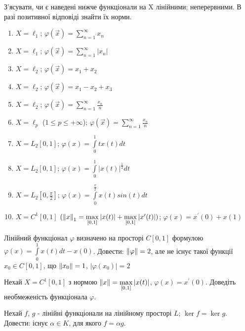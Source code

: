\begin{exercise}
    З'ясувати, чи є наведені нижче функціонали на X лінійними; 
    неперервними. В разі позитивної відповіді знайти їх норми.
    \begin{enumerate}[label=\ukr*)]
        \item $X = \ell_1$; $\varphi(\vec{x}) = \sum\limits_{n=1}^{\infty} x_n $
        \item $X = \ell_1$; $\varphi(\vec{x}) = \sum\limits_{n=1}^{\infty} |x_n| $
        \item $X = \ell_2$; $\varphi(\vec{x}) = x_1 + x_2 $
        \item $X = \ell_2$; $\varphi(\vec{x}) = x_1 - x_2 + x_3$
        \item $X = \ell_2$; $\varphi(\vec{x}) = \sum\limits_{n=1}^{\infty} \frac{x_n}{n}$
        \item $X = \ell_p$ ($1 \leq p \leq +\infty$); $\varphi(\vec{x}) = 
        \sum\limits_{n=1}^{\infty} \frac{x_n}{n}$
        \item $X = L_2[0,1]$; $\varphi(x) = \int\limits_0^1 tx(t)dt$
        \item $X = L_2[0,1]$; $\varphi(x) = \int\limits_0^1 |x(t)|^{\frac{1}{2}}dt$
        \item $X = L_2[0,\frac{\pi}{2}]$; 
        $\varphi(x) = \int\limits_0^{\frac{\pi}{2}} x(t)sin(t)dt$
        \item $X = C^1[0,1]$ $(\left\lVert x\right\rVert_1 = \max\limits_{[0,1]}|x(t)| + 
        \max\limits_{[0,1]}|x^{\prime}(t)|)$; $\varphi(x) = x^{\prime}(0) + x(1)$
    \end{enumerate}
\end{exercise}

\begin{exercise}
    Лінійний функціонал $\varphi$ визначено на просторі $C[0, 1]$ формулою 
    $\varphi(x) = \int\limits_0^1 x(t)dt - x(0)$. Довести: $\left\lVert\varphi\right\rVert = 2$, 
    але не існує такої функції $x_0 \in C[0, 1]$, що $\left\lVert x_0\right\rVert = 1$, $|\varphi(x_0)| = 2$
\end{exercise}

\begin{exercise}
    Нехай $X = C^1[0, 1]$ з нормою $\left\lVert x\right\rVert = \max\limits_{[0, 1]}|x(t)|$, 
    $\varphi(x) = x^\prime(0)$. Доведіть необмеженість функціонала $\varphi$.
\end{exercise}

\begin{exercise}
    Нехай $f$, $g$ - лінійні функціонали на лінійному просторі $L$; $\ker f = \ker g$. 
    Довести: існує $\alpha \in K$, для якого $f = \alpha g$.
\end{exercise}

